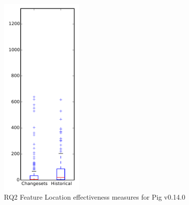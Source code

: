 
\begin{figure}[t]
\centering
\includegraphics[width=0.36\textwidth]{figures/flt/rq2_pig}
\caption{RQ2 Feature Location effectiveness measures for Pig v0.14.0}
\label{fig:flt:rq2:pig}
\end{figure}
